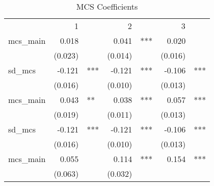 \begin{table}[!h]
\caption{MCS Coefficients}
\centering
\begin{tabular}{lllllll}
\cline{1-7}
\multicolumn{1}{r}{} &
  \multicolumn{2}{c}{1} &
  \multicolumn{2}{c}{2} &
  \multicolumn{2}{c}{3} \\
\cline{1-7}
\multicolumn{1}{l}{mcs\_main} &
  \multicolumn{1}{r}{0.018} &
  \multicolumn{1}{l}{} &
  \multicolumn{1}{r}{0.041} &
  \multicolumn{1}{l}{***} &
  \multicolumn{1}{r}{0.020} &
  \multicolumn{1}{l}{} \\
\multicolumn{1}{l}{} &
  \multicolumn{1}{r}{(0.023)} &
  \multicolumn{1}{l}{} &
  \multicolumn{1}{r}{(0.014)} &
  \multicolumn{1}{l}{} &
  \multicolumn{1}{r}{(0.016)} &
  \multicolumn{1}{l}{} \\
\multicolumn{1}{l}{sd\_mcs} &
  \multicolumn{1}{r}{-0.121} &
  \multicolumn{1}{l}{***} &
  \multicolumn{1}{r}{-0.121} &
  \multicolumn{1}{l}{***} &
  \multicolumn{1}{r}{-0.106} &
  \multicolumn{1}{l}{***} \\
\multicolumn{1}{l}{} &
  \multicolumn{1}{r}{(0.016)} &
  \multicolumn{1}{l}{} &
  \multicolumn{1}{r}{(0.010)} &
  \multicolumn{1}{l}{} &
  \multicolumn{1}{r}{(0.013)} &
  \multicolumn{1}{l}{} \\
\multicolumn{1}{l}{mcs\_main} &
  \multicolumn{1}{r}{0.043} &
  \multicolumn{1}{l}{**} &
  \multicolumn{1}{r}{0.038} &
  \multicolumn{1}{l}{***} &
  \multicolumn{1}{r}{0.057} &
  \multicolumn{1}{l}{***} \\
\multicolumn{1}{l}{} &
  \multicolumn{1}{r}{(0.019)} &
  \multicolumn{1}{l}{} &
  \multicolumn{1}{r}{(0.011)} &
  \multicolumn{1}{l}{} &
  \multicolumn{1}{r}{(0.013)} &
  \multicolumn{1}{l}{} \\
\multicolumn{1}{l}{sd\_mcs} &
  \multicolumn{1}{r}{-0.121} &
  \multicolumn{1}{l}{***} &
  \multicolumn{1}{r}{-0.121} &
  \multicolumn{1}{l}{***} &
  \multicolumn{1}{r}{-0.106} &
  \multicolumn{1}{l}{***} \\
\multicolumn{1}{l}{} &
  \multicolumn{1}{r}{(0.016)} &
  \multicolumn{1}{l}{} &
  \multicolumn{1}{r}{(0.010)} &
  \multicolumn{1}{l}{} &
  \multicolumn{1}{r}{(0.013)} &
  \multicolumn{1}{l}{} \\
\multicolumn{1}{l}{mcs\_main} &
  \multicolumn{1}{r}{0.055} &
  \multicolumn{1}{l}{} &
  \multicolumn{1}{r}{0.114} &
  \multicolumn{1}{l}{***} &
  \multicolumn{1}{r}{0.154} &
  \multicolumn{1}{l}{***} \\
\multicolumn{1}{l}{} &
  \multicolumn{1}{r}{(0.063)} &
  \multicolumn{1}{l}{} &
  \multicolumn{1}{r}{(0.032)} &

\end{tabular}
\end{table}
